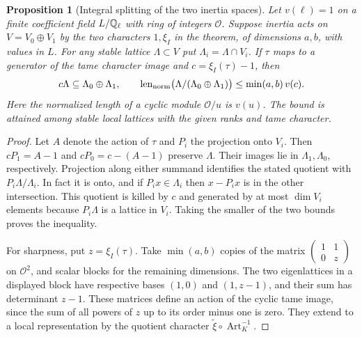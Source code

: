 \documentclass[a4paper,11pt]{article}
\newtheorem{proposition}{Proposition}[section]
\theoremstyle{definition}
\theoremstyle{remark}
\numberwithin{equation}{section}
\begin{document}
\begin{proposition}[Integral splitting of the two inertia spaces]
\leavevmode\label{prop:inertialattice738}
Let \(v(\ell)=1\) on a finite coefficient field \(L/\mathbb Q_\ell\)
with ring of integers \(\mathcal O\). Suppose inertia acts on
\(V=V_0\oplus V_1\) by the two characters \(1,\xi_I\) in the
theorem, of dimensions \(a,b\), with values in \(L\).
For any stable lattice \(\Lambda\subset V\) put
\(\Lambda_i=\Lambda\cap V_i\). If \(\tau\) maps to a generator of
the tame character image and \(c=\xi_I(\tau)-1\), then
\[
       c\Lambda\subseteq\Lambda_0\oplus\Lambda_1,\qquad
       \operatorname{len}_{\rm norm}
          \bigl(\Lambda/(\Lambda_0\oplus\Lambda_1)\bigr)
                     \le\min(a,b)\,v(c).
\]
Here the normalized length of a cyclic module \(\mathcal O/u\)
is \(v(u)\). The bound is attained among stable local lattices
with the given ranks and tame character.
\end{proposition}
\begin{proof}
Let \(A\) denote the action of \(\tau\) and \(P_i\) the projection
onto \(V_i\). Then \(cP_1=A-1\) and \(cP_0=c-(A-1)\) preserve
\(\Lambda\). Their images lie in \(\Lambda_1,\Lambda_0\),
respectively. Projection along either summand identifies the stated
quotient with \(P_i\Lambda/\Lambda_i\). In fact it is onto, and if
\(P_i x\in\Lambda_i\) then \(x-P_i x\) is in the other intersection.
This quotient is killed by \(c\) and generated by at most
\(\dim V_i\) elements because \(P_i\Lambda\) is a lattice in
\(V_i\). Taking the smaller of the two bounds proves the inequality.

For sharpness, put \(z=\xi_I(\tau)\). Take
\(\min(a,b)\) copies of the matrix
\(\left(\begin{smallmatrix}1&1\\0&z\end{smallmatrix}\right)\)
on \(\mathcal O^2\), and scalar blocks for the remaining dimensions.
The two eigenlattices in a displayed block have respective bases
\((1,0)\) and \((1,z-1)\), and their sum has determinant \(z-1\).
These matrices define an action of the cyclic tame image, since
the sum of all powers of \(z\) up to its order minus one is zero.
They extend to a local representation by the quotient character
\(\widetilde\xi\circ\operatorname{Art}_K^{-1}\).
\end{proof}
\end{document}
